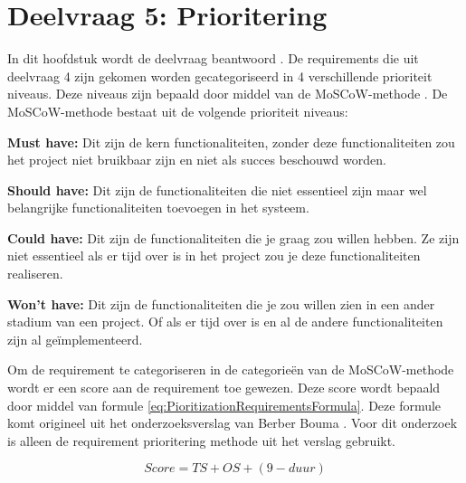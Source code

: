 \section{Deelvraag 5: Prioritering}
\label{sec:Prioritering}
In dit hoofdstuk wordt de deelvraag beantwoord \qw{\textit{\SubquestionFive}}.
De requirements die uit deelvraag 4 zijn gekomen worden gecategoriseerd in 4 verschillende prioriteit niveaus.
Deze niveaus zijn bepaald door middel van de MoSCoW-methode \Parencite{MoSCoW}.
De MoSCoW-methode bestaat uit de volgende prioriteit niveaus:

\whitespace
\textbf{Must have:} Dit zijn de kern functionaliteiten, zonder deze functionaliteiten zou het project niet bruikbaar zijn en niet als succes beschouwd worden.

\whitespace[1]
\textbf{Should have:} Dit zijn de functionaliteiten die niet essentieel zijn maar wel belangrijke functionaliteiten toevoegen in het systeem.

\whitespace[1]
\textbf{Could have:} Dit zijn de functionaliteiten die je graag zou willen hebben.
Ze zijn niet essentieel als er tijd over is in het project zou je deze functionaliteiten realiseren.

\whitespace[1]
\textbf{Won't have:} Dit zijn de functionaliteiten die je zou willen zien in een ander stadium van een project.
Of als er tijd over is en al de andere functionaliteiten zijn al geïmplementeerd.

\whitespace[2]
Om de requirement te categoriseren in de categorieën van de MoSCoW-methode wordt er een score aan de requirement toe gewezen.
Deze score wordt bepaald door middel van formule \ref{eq:PioritizationRequirementsFormula}.
Deze formule komt origineel uit het onderzoeksverslag van Berber Bouma \Parencite{BerberVerslag}.
Voor dit onderzoek is alleen de requirement prioritering methode uit het verslag gebruikt.

\whitespace
\begin{equation}
	\label{eq:PioritizationRequirementsFormula}
	Score = TS + OS + (9 - duur)
\end{equation}

